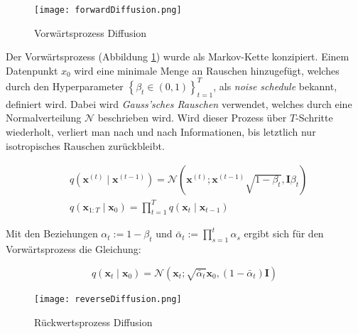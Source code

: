 \documentclass[
  a4paper,  %
  twoside,  %
  bibliography=totoc,
  headsepline,
  cleardoublepage=empty,
  parskip=half,
  draft=false
]{scrbook}
\begin{document}
\begin{figure}[h]
  \centering
  \texttt{[image: forwardDiffusion.png]}
  \caption[Forward diffusion]{Vorwärtsprozess Diffusion \cite{machine_learning_at_berkeley_diffusion_2022}}
  \label{fig:forwardDiffusion}
\end{figure} 

Der Vorwärtsprozess (Abbildung \ref{fig:forwardDiffusion}) wurde als Markov-Kette konzipiert\cite{sohl-dickstein_deep_2015, ho_denoising_2020}. Einem Datenpunkt $x_0$ wird eine minimale Menge an Rauschen hinzugefügt, welches durch den Hyperparameter $\left\{\beta_t \in(0,1)\right\}_{t=1}^T$, als \emph{noise schedule} bekannt, definiert wird\cite{ho_denoising_2020, machine_learning_at_berkeley_diffusion_2022}. Dabei wird \emph{Gauss'sches Rauschen}\cite{shannon_communication_1949} verwendet, welches durch eine Normalverteilung $\mathcal{N}$ beschrieben wird. Wird dieser Prozess über $T$-Schritte wiederholt, verliert man nach und nach Informationen, bis letztlich nur isotropisches Rauschen zurückbleibt\cite{machine_learning_at_berkeley_diffusion_2022}.

\begin{align}
   & q\left(\mathbf{x}^{(t)} \mid \mathbf{x}^{(t-1)}\right) = \mathcal{N}\left(\mathbf{x}^{(t)} ; \mathbf{x}^{(t-1)} \sqrt{1-\beta_t}, \mathbf{I} \beta_t\right) \\
   & q\left(\mathbf{x}_{1: T} \mid \mathbf{x}_0\right)=\prod_{t=1}^T q\left(\mathbf{x}_t \mid \mathbf{x}_{t-1}\right)
\end{align}

Mit den Beziehungen \( \alpha_t:=1-\beta_t \) und \( \bar{\alpha}_t:=\prod_{s=1}^t \alpha_s \) ergibt sich für den Vorwärtsprozess die Gleichung:

\begin{equation}
    q\left(\mathbf{x}_t \mid \mathbf{x}_0\right)=\mathcal{N}\left(\mathbf{x}_t ; \sqrt{\bar{\alpha}_t} \mathbf{x}_0,\left(1-\bar{\alpha}_t\right) \mathbf{I}\right)
\end{equation}

\begin{figure}[h]
  \centering
  \texttt{[image: reverseDiffusion.png]}
  \caption[Reverse diffusion]{Rückwertsprozess Diffusion \cite{machine_learning_at_berkeley_diffusion_2022}}
  \label{fig:reverseDiffusion}
\end{figure} 
\end{document}
